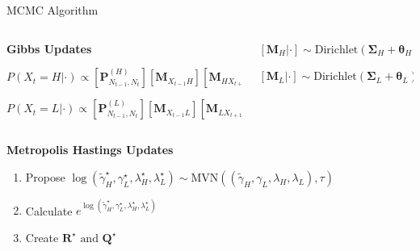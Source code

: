 \documentclass[10pt]{beamer}
\begin{document}
 


\begin{frame}{MCMC Algorithm}
  
  
  
  \begin{columns}[T]
    
    \begin{column}{.55\textwidth}
    \begin{block}{}
  
  \textbf{Gibbs Updates}
  
  $P(X_t = H | \cdot) \propto \left[ \mathbf{P}^{(H)}_{N_{t-1}, N_t}\right] \left[ \mathbf{M}_{X_{t-1}H} \right] \left[ \mathbf{M}_{HX_{t+1}}\right]$
  
   	$P(X_t = L | \cdot) \propto \left[ \mathbf{P}^{(L)}_{N_{t-1}, N_t}\right] \left[ \mathbf{M}_{X_{t-1}L} \right] \left[ \mathbf{M}_{LX_{t+1}}\right]$
    
     \end{block}
    \end{column}
    
    \begin{column}{.45\textwidth}
     \begin{block}{}
     
     \vspace{8mm}
     
  $\left[\mathbf{M}_{H} | \cdot \right] \sim \text{Dirichlet}(\bm{\Sigma}_{H} + \bm{\theta}_H)$
  
  $\left[\mathbf{M}_{L} | \cdot \right] \sim \text{Dirichlet}(\bm{\Sigma}_{L} + \bm{\theta}_L)$ 
    	
\end{block}
    \end{column}
    
  \end{columns}
  
  \vspace{5mm}
  
\textbf{Metropolis Hastings Updates}\\

\begin{enumerate}
	\item Propose $\log (\tilde{\gamma}^\star_H, \gamma^\star_L, \lambda^\star_H, \lambda^\star_L) \sim \text{MVN}((\tilde{\gamma}_H, \gamma_L, \lambda_H, \lambda_L), \tau)$
    
    \item Calculate $e^{ \log (\tilde{\gamma}^\star_H, \gamma^\star_L, \lambda^\star_H, \lambda^\star_L)}$
    \item Create $\mathbf{R}^\star \text{ and } \mathbf{Q}^\star$
   

\end{enumerate}
\end{frame}
\end{document}
